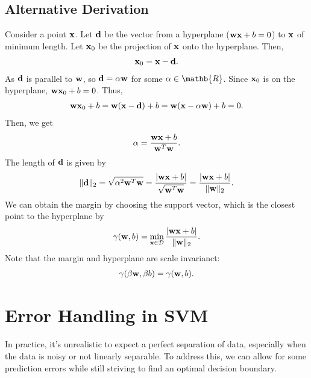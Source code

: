 \subsection{Alternative Derivation}
Consider a point ${\mathbf{x}}$. Let ${\mathbf{d}}$ be the vector from a hyperplane (\ie ${\mathbf{w}}{\mathbf{x}}+b=0$) to ${\mathbf{x}}$ of minimum length. Let ${\mathbf{x}}_0$ be the projection of ${\mathbf{x}}$ onto the hyperplane. Then, 
\begin{align*}
	{\mathbf{x}}_0 = {\mathbf{x}} - {\mathbf{d}}.
\end{align*}
As ${\mathbf{d}}$ is parallel to ${\mathbf{w}}$, so ${\mathbf{d}} = \alpha {\mathbf{w}}$ for some $\alpha\in \mathb{R}$. Since ${\mathbf{x}}_0$ is on the hyperplane, ${\mathbf{w}}{\mathbf{x}}_0 + b = 0$. Thus, 
\begin{align*}
	{\mathbf{w}}{\mathbf{x}}_0 + b = {\mathbf{w}}({\mathbf{x}}-{\mathbf{d}}) + b = {\mathbf{w}}({\mathbf{x}}-\alpha{\mathbf{w}}) + b = 0.
\end{align*}
Then, we get
\begin{align*}
	\alpha = \frac{{\mathbf{w}}{\mathbf{x}}+b}{{\mathbf{w}}^T{\mathbf{w}}}.
\end{align*}
The length of ${\mathbf{d}}$ is given by  
\begin{align*}
	\|{\mathbf{d}}\|_2 = \sqrt{\alpha^2{\mathbf{w}}^T{\mathbf{w}}} = \frac{|{\mathbf{w}}{\mathbf{x}}+b|}{\sqrt{{\mathbf{w}}^T{\mathbf{w}}}} = \frac{|{\mathbf{w}}{\mathbf{x}}+b|}{\|{\mathbf{w}}\|_2}.
\end{align*}
We can obtain the margin by choosing the support vector, which is the closest point to the hyperplane by
\begin{align*}
	\gamma({\mathbf{w}}, b) = \min_{{\mathbf{x}}\in \mathcal{D}}\frac{|{\mathbf{w}}{\mathbf{x}}+b|}{\|{\mathbf{w}}\|_2}.
\end{align*}
Note that the margin and hyperplane are scale invarianct:
\begin{align*}
	\gamma(\beta{\mathbf{w}}, \beta b) = \gamma({\mathbf{w}}, b).
\end{align*}


\section{Error Handling in SVM}
In practice, it's unrealistic to expect a perfect separation of data, especially when the data is noisy or not linearly separable. To address this, we can allow for some prediction errors while still striving to find an optimal decision boundary.

